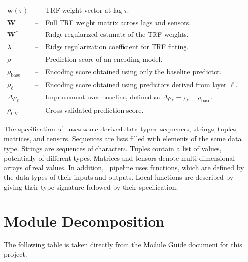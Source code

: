 \documentclass[12pt, titlepage]{article}
\begin{document}
\begin{longtable}{l l p{11.0cm}}
$\mathbf{w}(\tau)$ & -- & TRF weight vector at lag $\tau$.\\
$\mathbf{W}$ & -- & Full TRF weight matrix across lags and sensors.\\
$\mathbf{W}^{\ast}$ & -- & Ridge-regularized estimate of the TRF weights.\\
$\lambda$ & -- & Ridge regularization coefficient for TRF fitting.\\

$\rho$ & -- & Prediction score of an encoding model.\\
$\rho_{\mathrm{base}}$ & -- & Encoding score obtained using only the baseline predictor.\\
$\rho_{\ell}$ & -- & Encoding score obtained using predictors derived from layer $\ell$.\\
$\Delta \rho_{\ell}$ & -- & Improvement over baseline, defined as $\Delta \rho_{\ell} = \rho_{\ell} - \rho_{\mathrm{base}}$.\\
$\rho_{\mathrm{CV}}$ & -- & Cross-validated prediction score.\\

\end{longtable}


\noindent
The specification of \progname \ uses some derived data types: sequences,
strings, tuples, matrices, and tensors. Sequences are lists filled with
elements of the same data type. Strings are sequences of characters. Tuples
contain a list of values, potentially of different types. Matrices and tensors
denote multi-dimensional arrays of real values. In addition, \progname \ pipeline uses
functions, which are defined by the data types of their inputs and outputs.
Local functions are described by giving their type signature followed by their
specification.

\section{Module Decomposition}

The following table is taken directly from the Module Guide document for this project.
\end{document}
